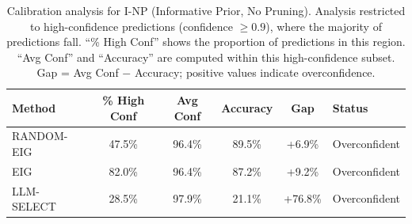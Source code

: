 \begin{table}[htbp]
\centering
\small
\caption{Calibration analysis for I-NP (Informative Prior, No Pruning). Analysis restricted to high-confidence predictions (confidence $\geq 0.9$), where the majority of predictions fall. ``\% High Conf'' shows the proportion of predictions in this region. ``Avg Conf'' and ``Accuracy'' are computed within this high-confidence subset. Gap = Avg Conf $-$ Accuracy; positive values indicate overconfidence.}
\label{tab:calibration-notprune_notuniform}
\begin{tabular}{@{}lccccl@{}}
\toprule
Method & \% High Conf & Avg Conf & Accuracy & Gap & Status \\
\midrule
RANDOM-EIG & 47.5\% & 96.4\% & 89.5\% & +6.9\% & Overconfident \\
EIG & 82.0\% & 96.4\% & 87.2\% & +9.2\% & Overconfident \\
LLM-SELECT & 28.5\% & 97.9\% & 21.1\% & +76.8\% & Overconfident \\
\bottomrule
\end{tabular}
\end{table}